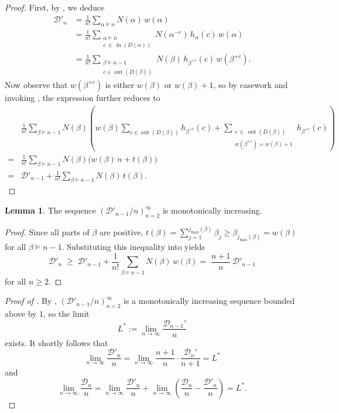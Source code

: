 \documentclass[12pt]{amsart}
\DeclareMathOperator{\inn}{in}
\DeclareMathOperator{\out}{out}
\theoremstyle{definition}
\newtheorem{lemma}[theorem]{Lemma}
\begin{document}
\begin{proof}
First, by , we deduce
\begin{align*}
\mathcal{D}'_n
  &= \frac{1}{n!}\sum_{\alpha\models n}N(\alpha)\,w(\alpha) \\
  &= \frac{1}{n!}\sum_{\substack{\alpha\models n \\ c\,\in\,\inn(D(\alpha))}} N(\alpha^{-c})\,h_\alpha(c)\,w(\alpha) \\
  &= \frac{1}{n!}\sum_{\substack{\beta\models n-1 \\ c\in \out(D(\beta))}} N(\beta)\,h_{\beta^{+c}}(c)\,w(\beta^{+c}).
\end{align*}
Now observe that $w(\beta^{+c})$ is either $w(\beta)$ or $w(\beta)+1$, so by casework and invoking , the expression further reduces to
\begin{align*}
&\frac{1}{n!}\sum_{\beta\models n-1}N(\beta)\left(w(\beta)\sum_{c\in \out(D(\beta))}h_{\beta^{+c}}(c) + \sum_{\substack{c\,\in\,\out(D(\beta)) \\ w(\beta^{+c})=w(\beta)+1}} h_{\beta^{+c}}(c)\right) \\
= &\frac{1}{n!}\sum_{\beta\models n-1}N(\beta)\bigl(w(\beta)\, n+t(\beta)\bigr) \\
= &\mathcal{D}'_{n-1} + \frac{1}{n!}\sum_{\beta\models n-1}N(\beta)\,t(\beta).
\end{align*}
\end{proof}

\begin{lemma}\label{lem:floor}
The sequence $(\mathcal{D}'_{n-1}/n)_{n=2}^{\infty}$ is monotonically increasing.
\end{lemma}
\begin{proof}
Since all parts of $\beta$ are positive, $t(\beta)=\sum_{j=1}^{j_{\max}(\beta)}\beta_j\ge\beta_{j_{\max}(\beta)}=w(\beta)$ for all $\beta\models n-1$. Substituting this inequality into  yields
\[\mathcal{D}'_n \;\ge\; \mathcal{D}'_{n-1} + \frac{1}{n!}\sum_{\beta\models n-1}N(\beta)\,w(\beta)=\; \frac{n+1}{n}\,\mathcal{D}'_{n-1}\]
for all $n\ge2$.
\end{proof}

\begin{proof}[Proof of ]
By , $(\mathcal{D}'_{n-1}/n)_{n=2}^{\infty}$ is a monotonically increasing sequence bounded above by $1$, so the limit \[L^*:=\lim_{n\to\infty}\frac{\mathcal{D}_{n-1}'}{n}\] exists.  It shortly follows that
\[\lim_{n\to\infty}\frac{\mathcal{D}'_n}{n} = \lim_{n\to\infty}\frac{n+1}{n}\cdot\frac{\mathcal{D}_{n}'}{n+1} = L^*\]
and
\[\lim_{n\to\infty}\frac{\mathcal{D}_n}{n} = \lim_{n\to\infty}\frac{\mathcal{D}'_n}{n} + \lim_{n\to\infty}\left(\frac{\mathcal{D}_n}{n}-\frac{\mathcal{D}'_n}{n}\right) = L^*.\]
\end{proof}
\end{document}
